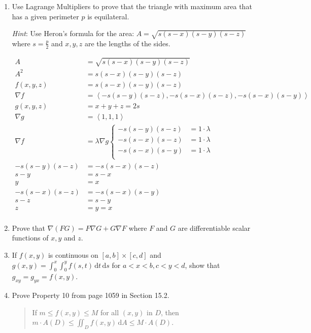 \documentclass[11pt]{article}
\begin{document}
\begin{enumerate}
\item Use Lagrange Multipliers to prove that the triangle with maximum area that
  has a given perimeter \(p\) is equilateral.

  \textit{Hint}: Use Heron's formula for the area:
  \(A = \sqrt{s(s - x)(s - y)(s - z)}\) where \(s = \frac{p}{2}\) and
  \(x, y, z\) are the lengths of the sides.

  \begin{align*}
    A &= \sqrt{s(s - x)(s - y)(s - z)} \\
    A^2 &= s(s - x)(s - y)(s - z) \\
    f(x, y, z) &= s(s - x)(s - y)(s - z) \\
    \nabla f &= \left< -s(s - y)(s - z), -s(s - x)(s - z), -s(s - x)(s - y) \right> \\
    g(x, y, z) &= x + y + z = 2s \\
    \nabla g &= \left< 1, 1, 1 \right> \\
    \nabla f &= \lambda\nabla g
               \begin{cases}
                 -s(s - y)(s - z) &= 1 \cdot \lambda \\
                 -s(s - x)(s - z) &= 1 \cdot \lambda \\
                 -s(s - x)(s - y) &= 1 \cdot \lambda \\
               \end{cases} \\
    -s(s - y)(s - z) &= -s(s - x)(s - z) \\
    s - y &= s - x \\
    y &= x \\
    -s(s - x)(s - z) &= -s(s - x)(s - y) \\
    s - z &= s - y \\
    z &= y = x \\
  \end{align*}

\item Prove that \( \nabla (FG) = F \nabla G + G \nabla F \) where \( F \) and
  \( G \) are differentiable scalar functions of \( x, y \) and \( z \).

\item If \(f(x,y)\) is continuous on \([a,b] \times [c,d]\) and
  \(g(x,y) = \int_0^x \int_0^y f(s,t) \, \mathrm{d}t \, \mathrm{d}s\) for
  \(a < x < b, c < y < d\), show that \(g_{xy} = g_{yx} = f(x,y)\).

\item Prove Property 10 from page 1059 in Section 15.2.
  \begin{quote}
    If \(m \leq f(x,y) \leq M\) for all \((x,y)\) in \(D\), then
    \(m \cdot A(D) \leq \iint_D f(x,y) \, \mathrm{d}A \leq M \cdot A(D)\).
  \end{quote}
\end{enumerate}
\end{document}
